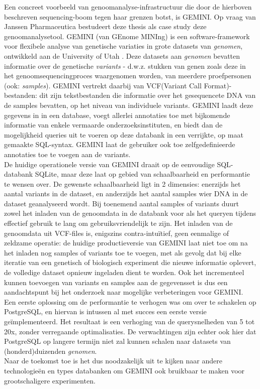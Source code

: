 Een concreet voorbeeld van genoomanalyse-infrastructuur die door de hierboven beschreven sequencing-boom tegen haar grenzen botst, is GEMINI. Op vraag van Janssen Pharmaceutica bestudeert deze thesis als case study deze genoomanalysetool. GEMINI (van GEnome MINIng) is een software-framework voor flexibele analyse van genetische variaties in grote datasets van \emph{genomen}, ontwikkeld aan de University of Utah \cite{10.1371/journal.pcbi.1003153}. Deze datasets aan \emph{genomen} bevatten informatie over de genetische \textit{variants} - d.w.z. stukken van genen zoals deze in het genoomsequencingproces waargenomen worden, van meerdere proefpersonen (ook: \textit{samples}). GEMINI vertrekt daarbij van VCF(Variant Call Format)-bestanden: dit zijn tekstbestanden die informatie over het gesequencete DNA van de samples bevatten, op het niveau van individuele variants. GEMINI laadt deze gegevens in in een database, voegt allerlei annotaties toe met bijkomende informatie van enkele vermaarde onderzoeksinstituten, en biedt dan de mogelijkheid queries uit te voeren op deze databank in een verrijkte, op maat gemaakte SQL-syntax. GEMINI laat de gebruiker ook toe zelfgedefinieerde annotaties toe te voegen aan de variants. \\
De huidige operationele versie van GEMINI draait op de eenvoudige SQL-databank SQLite, maar deze laat op gebied van schaalbaarheid en performantie te wensen over. De gewenste schaalbaarheid ligt in 2 dimensies: enerzijds het aantal variants in de dataset, en anderzijds het aantal samples wier DNA in de dataset geanalyseerd wordt. Bij toenemend aantal samples of variants duurt zowel het inladen van de genoomdata in de databank voor als het queryen tijdens effectief gebruik te lang om gebruiksvriendelijk te zijn. Het inladen van de genoomdata uit VCF-files is, enigszins contra-intu\"itief, geen eenmalige of zeldzame operatie: de huidige productieversie van GEMINI laat niet toe om na het inladen nog samples of variants toe te voegen, met als gevolg dat bij elke iteratie van een genetisch of biologisch experiment die nieuwe informatie oplevert, de volledige dataset opnieuw ingeladen dient te worden. Ook het incrementeel kunnen toevoegen van variants en samples aan de gegevensset is dus een aandachtspunt bij het onderzoek naar mogelijke verbeteringen voor GEMINI.\\
Een eerste oplossing om de performantie te verhogen was om over te schakelen op PostgreSQL, en hiervan is intussen al met succes een eerste versie ge\"implementeerd. Het resultaat is een verhoging van de querysnelheden van 5 tot 20x, zonder verregaande optimalisaties. De verwachtingen zijn echter ook hier dat PostgreSQL op langere termijn niet zal kunnen schalen naar datasets van (honderd)duizenden \emph{genomen}.\\
Naar de toekomst toe is het dus noodzakelijk uit te kijken naar andere technologie\"en en types databanken om GEMINI ook bruikbaar te maken voor grootschaligere experimenten.

